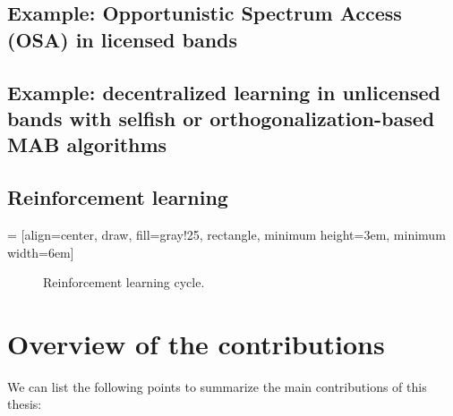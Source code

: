\subsection{Example: Opportunistic Spectrum Access (OSA) in licensed bands}

\subsection{Example: decentralized learning in unlicensed bands with selfish or orthogonalization-based MAB algorithms}


\subsection{Reinforcement learning}

 = [align=center, draw, fill=gray!25, rectangle, minimum height=3em, minimum width=6em]
\begin{figure}[h!]
    \centering
\caption{Reinforcement learning cycle.}
\label{fig:1:ReinforcementLearningCycle}
\end{figure}


\section{Overview of the contributions}
\label{sec:1:contributions}

We can list the following points to summarize the main contributions of this thesis:

